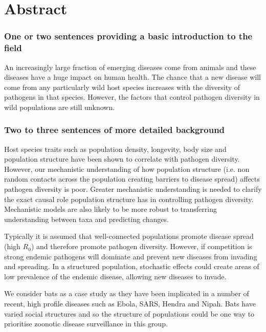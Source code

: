 
\clearpage
\section{Abstract}

\subsubsection{One or two sentences providing a basic introduction to the field}
An increasingly large fraction of emerging diseases come from animals \cite{jones2008global, taylor2001risk} and these diseases have a huge impact on human health.
The chance that a new disease will come from any particularly wild host species increases with the diversity of pathogens in that species.
However, the factors that control pathogen diversity in wild populations are still unknown.



\subsubsection{Two to three sentences of more detailed background}

Host species traits such as population density, longevity, body size and population structure have been shown to correlate with pathogen diversity.
However, our mechanistic understanding of how population structure (i.e. non random contacts across the population creating barriers to disease spread) affects pathogen diversity is poor.
Greater mechanistic understanding is needed to clarify the exact causal role population structure has in controlling pathogen diversity.
Mechanistic models are also likely to be more robust to transferring understanding between taxa and predicting changes. %

Typically it is assumed that well-connected populations promote disease spread (high $R_0$) and therefore promote pathogen diversity.
However, if competition is strong endemic pathogens will dominate and prevent new diseases from invading and spreading. \cite{ackleh2003competitive,bremermann1989competitive,martcheva2013competitive,qiu2013vector}
In a structured population, stochastic effects could create areas of low prevalence of the endemic disease, allowing new diseases to invade.

We consider bats as a case study as they have been implicated in a number of recent, high profile diseases such as Ebola, SARS, Hendra and Nipah.
Bats have varied social structures and so the structure of populations could be one way to prioritise zoonotic disease surveillance in this group.

